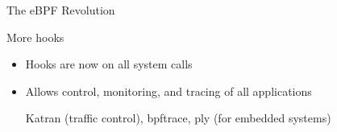 \begin{reveals}
\begin{frame}[c]{The eBPF Revolution}
  \vfill

  \begin{block}{More hooks}
    \begin{itemize}
    \item Hooks are now on all system calls
    \item Allows control, monitoring, and tracing of all applications
      \begin{center}
        Katran (traffic control), bpftrace, ply (for embedded systems)
      \end{center}
    \end{itemize}
  \end{block}

\end{frame}


\end{reveals}

